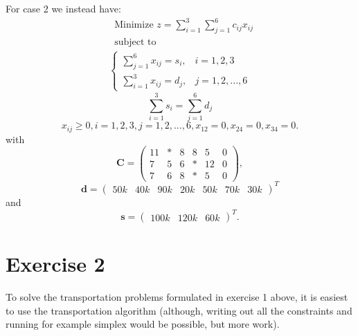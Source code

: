 \documentclass{article}
\begin{document}
  \noindent
  For case 2 we instead have:
   \begin{align*}
  & \text{Minimize } z = \sum_{i=1}^{3}\sum_{j=1}^6 c_{ij}x_{ij} \\
  & \text{subject to}
    \label{eq17}
  \end{align*}
  \begin{align}
    \begin{cases}
      \sum_{j=1}^{6} x_{ij} = s_{i}, & i = 1, 2, 3 \\
      \sum_{i=1}^{3} x_{ij} = d_{j}, & j = 1, 2, ..., 6
    \end{cases}
  \end{align}
  \begin{equation}
    \sum_{i=1}^{3} s_{i} = \sum_{j=1}^6 d_{j}
    \label{eq19}
  \end{equation}
  \begin{equation}
    x_{ij} \geq 0, i = 1, 2, 3, j = 1, 2, ..., 6, x_{12} = 0, x_{24} = 0, x_{34} = 0.
    \label{eq20}
  \end{equation}
  with
  \begin{equation}
    \mathbf{C} =
    \begin{pmatrix}
      11 & * & 8 & 8  & 5  & 0\\
      7  & 5 & 6 & *  & 12 & 0\\
      7  & 6 & 8 & *  & 5  & 0
    \end{pmatrix},
    \label{eq21}
  \end{equation}
  \begin{equation}
    \mathbf{d} =
    \begin{pmatrix}
      50k & 40k & 90k & 20k & 50k & 70k & 30k
    \end{pmatrix}^T
    \label{eq22}
  \end{equation}
  and
  \begin{equation}
    \mathbf{s} =
    \begin{pmatrix}
      100k & 120k & 60k
    \end{pmatrix}^T.
    \label{eq23}
  \end{equation}

  \section*{Exercise 2}
  To solve the transportation problems formulated in exercise 1 above, it is
  easiest to use the transportation algorithm (although, writing out all the
  constraints and running for example simplex would be possible, but more work).
\end{document}

